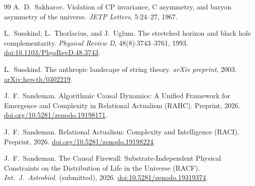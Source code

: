 \documentclass[11pt,a4paper]{article}
\begin{document}
\begin{thebibliography}{99}
A.~D.~Sakharov.
\newblock Violation of CP invariance, C asymmetry, and baryon asymmetry of the universe.
\newblock \emph{JETP Letters}, 5:24--27, 1967.

L.~Susskind, L.~Thorlacius, and J.~Uglum.
\newblock The stretched horizon and black hole complementarity.
\newblock \emph{Physical Review D}, 48(8):3743--3761, 1993.
\newblock \href{https://doi.org/10.1103/PhysRevD.48.3743}{doi:10.1103/PhysRevD.48.3743}.

L.~Susskind.
\newblock The anthropic landscape of string theory.
\newblock \emph{arXiv preprint}, 2003.
\newblock \href{https://arxiv.org/abs/hep-th/0302219}{arXiv:hep-th/0302219}.

J.~F.~Sandeman.
\newblock Algorithmic Causal Dynamics: A Unified Framework for Emergence
  and Complexity in Relational Actualism ({RAHC}).
\newblock Preprint, 2026.
\newblock \href{https://doi.org/10.5281/zenodo.19198171}{doi.org/10.5281/zenodo.19198171}.

J.~F.~Sandeman.
\newblock Relational Actualism: Complexity and Intelligence ({RACI}).
\newblock Preprint, 2026.
\newblock \href{https://doi.org/10.5281/zenodo.19198224}{doi.org/10.5281/zenodo.19198224}.


J.~F.~Sandeman.
\newblock The Causal Firewall: Substrate-Independent Physical Constraints
  on the Distribution of Life in the Universe (RACF).
\newblock \textit{Int.\ J.\ Astrobiol.} (submitted), 2026.
\newblock \href{https://doi.org/10.5281/zenodo.19319374}%
  {doi:10.5281/zenodo.19319374}.

\end{thebibliography}
\end{document}
